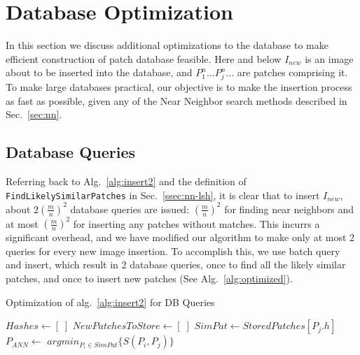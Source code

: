 \section{Database Optimization}\label{sec:opt}

In this section we discuss additional optimizations to the
database to make efficient construction of patch database feasible.
Here and below $I_{new}$ is an image about to be inserted into the
database, and $P^n_1...P^n_j...$ are patches comprising it.
To make large databases practical, our objective
is to make the insertion process as fast as possible, given any of the
Near Neighbor search methods described in Sec.~\ref{sec:nn}.

\subsection{Database Queries}

Referring back to Alg.~\ref{alg:insert2} and the definition of
\texttt{FindLikely{\allowbreak}SimilarPatches} in Sec.~\ref{ssec:nn-lsh},
it is clear that to insert $I_{new}$,
about $2\left(\frac{m}{n}\right)^2$ database queries are issued:
$\left(\frac{m}{n}\right)^2$ for finding near neighbors and
at most $\left(\frac{m}{n}\right)^2$ for inserting any patches without matches.
This incurrs a significant overhead, and we have modified our
algorithm to make only at most 2 queries for every new image insertion.
To accomplish this, we use batch query and insert, which result in 2
database queries, once to find all the likely similar patches,
and once to insert new patches (See Alg.~\ref{alg:optimized}).

\begin{algorithm}[h!]
  \caption{Optimization of alg.~\ref{alg:insert2} for DB Queries}
  \label{alg:optimized}
  \begin{algorithmic}[1]
    \State $Hashes \leftarrow [\;]$
    \EndFor
    \vspace{3mm}
    \State $NewPatchesToStore \leftarrow [\;]$
    \State $SimPat \leftarrow StoredPatches[P_j.h]$
    \State $P_{ANN} \leftarrow $ $argmin_{P_i \in SimPat} \{ S(P_i, P_j) \}$
    \EndIf
    \EndFor
    \vspace{3mm}
  \end{algorithmic}
\end{algorithm}

